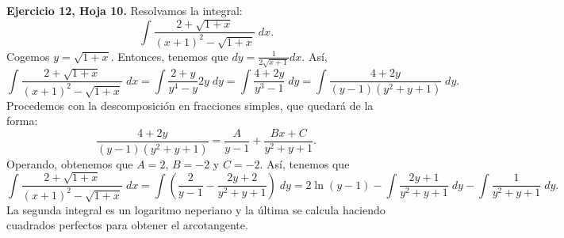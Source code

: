 \begin{eg}
\normalfont \textbf{Ejercicio 12, Hoja 10.} Resolvamos la integral:
\[ \int \frac{2 + \sqrt{1 + x}}{\left(x+1\right)^{2} - \sqrt{1 + x}} \; dx .\]
Cogemos $\displaystyle y = \sqrt{1 + x} $. Entonces, tenemos que $\displaystyle dy = \frac{1}{2\sqrt{x+1}}dx $. Así, 
\[ \int \frac{2 + \sqrt{1 + x}}{\left(x+1\right)^{2} - \sqrt{1 + x}} \; dx = \int \frac{2 + y}{y^{4}-y}2y \; dy = \int \frac{4+2y}{y^{3}-1} \; dy  = \int \frac{4 + 2y}{\left(y-1\right)\left(y^{2}+y+1\right)} \; dy.\]
Procedemos con la descomposición en fracciones simples, que quedará de la forma:
\[\frac{4 + 2y}{\left(y-1\right)\left(y^{2}+y+1\right)} = \frac{A}{y - 1} + \frac{Bx + C}{y^{2} + y+1} .\]
Operando, obtenemos que $\displaystyle A = 2 $, $\displaystyle B = -2 $ y $\displaystyle C = -2 $. Así, tenemos que
\[ \int \frac{2 + \sqrt{1 + x}}{\left(x+1\right)^{2} - \sqrt{1 + x}} \; dx  = \int \left(\frac{2}{y-1}-\frac{2y+2}{y^{2}+y+1}\right) \; dy = 2\ln\left(y-1\right) - \int \frac{2y+1}{y^{2}+y+1} \; dy-\int \frac{1}{y^{2}+y+1} \; dy .\]
La segunda integral es un logaritmo neperiano y la última se calcula haciendo cuadrados perfectos para obtener el arcotangente.
\end{eg}

